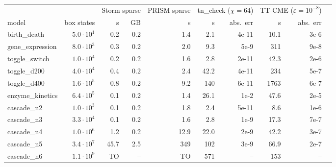 \begin{tabular}{lrrrrrrrrr}
\toprule
 & & \multicolumn{2}{c}{Storm sparse} & PRISM sparse & \multicolumn{2}{c}{tn\_check ($\chi{=}64$)} & \multicolumn{2}{c}{TT-CME ($\varepsilon{=}10^{-8}$)} \\
model & box states & s & GB & s & s & abs.\ err & s & abs.\ err \\
\midrule
birth\_death & $5.0\cdot 10^{1}$ & 0.2 & 0.2 & 1.4 & 2.1 & 4e-11 & 10.1 & 3e-6 \\
gene\_expression & $8.0\cdot 10^{3}$ & 0.3 & 0.2 & 2.0 & 9.3 & 5e-9 & 311 & 9e-8 \\
toggle\_switch & $1.0\cdot 10^{4}$ & 0.2 & 0.2 & 1.6 & 2.8 & 2e-11 & 42.3 & 2e-6 \\
toggle\_d200 & $4.0\cdot 10^{4}$ & 0.4 & 0.2 & 2.4 & 42.2 & 4e-11 & 234 & 5e-7 \\
toggle\_d400 & $1.6\cdot 10^{5}$ & 0.8 & 0.2 & 9.2 & 140 & 6e-11 & 1763 & 6e-7 \\
enzyme\_kinetics & $6.4\cdot 10^{5}$ & 0.1 & 0.2 & 1.4 & 26.1 & 1e-2 & 47.6 & 2e-5 \\
cascade\_n2 & $1.0\cdot 10^{3}$ & 0.1 & 0.2 & 1.8 & 2.4 & 5e-11 & 8.6 & 1e-6 \\
cascade\_n3 & $3.3\cdot 10^{4}$ & 0.1 & 0.2 & 1.6 & 2.8 & 1e-9 & 17.3 & 7e-7 \\
cascade\_n4 & $1.0\cdot 10^{6}$ & 1.2 & 0.2 & 12.9 & 22.0 & 2e-9 & 42.2 & 3e-7 \\
cascade\_n5 & $3.4\cdot 10^{7}$ & 45.7 & 2.5 & 349 & 102 & 3e-9 & 66.9 & 2e-7 \\
cascade\_n6 & $1.1\cdot 10^{9}$ & TO & -- & TO & 571 & -- & 153 & -- \\
\bottomrule
\end{tabular}
